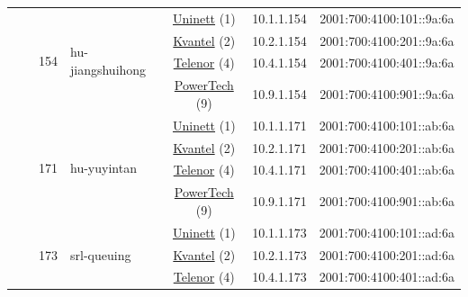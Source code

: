 \begin{small}
\begin{center}
\begin{longtable}{|c|c|c|c|c|c|c|c|}
  &  & \multirow{4}{*}{\tiny{154}} & \multicolumn{1}{|l|}{\multirow{4}{*}{\tiny{hu-jiangshuihong}}} & \multicolumn{2}{|c|}{\tiny{\href{https://www.uninett.no}{Uninett} (1)}} & \tiny{10.1.1.154} & \tiny{2001:700:4100:101::9a:6a} \\* \cline{5-5}\cline{6-6}\cline{7-7}\cline{8-8}
  &  &  &  & \multicolumn{2}{|c|}{\tiny{\href{http://kvantel.no}{Kvantel} (2)}} & \tiny{10.2.1.154} & \tiny{2001:700:4100:201::9a:6a} \\* \cline{5-5}\cline{6-6}\cline{7-7}\cline{8-8}
  &  &  &  & \multicolumn{2}{|c|}{\tiny{\href{https://www.telenor.no}{Telenor} (4)}} & \tiny{10.4.1.154} & \tiny{2001:700:4100:401::9a:6a} \\* \cline{5-5}\cline{6-6}\cline{7-7}\cline{8-8}
  &  &  &  & \multicolumn{2}{|c|}{\tiny{\href{http://www.powertech.no}{PowerTech} (9)}} & \tiny{10.9.1.154} & \tiny{2001:700:4100:901::9a:6a} \\* \cline{3-3}\cline{4-4}\cline{5-5}\cline{6-6}\cline{7-7}\cline{8-8}
  &  & \multirow{4}{*}{\tiny{171}} & \multicolumn{1}{|l|}{\multirow{4}{*}{\tiny{hu-yuyintan}}} & \multicolumn{2}{|c|}{\tiny{\href{https://www.uninett.no}{Uninett} (1)}} & \tiny{10.1.1.171} & \tiny{2001:700:4100:101::ab:6a} \\* \cline{5-5}\cline{6-6}\cline{7-7}\cline{8-8}
  &  &  &  & \multicolumn{2}{|c|}{\tiny{\href{http://kvantel.no}{Kvantel} (2)}} & \tiny{10.2.1.171} & \tiny{2001:700:4100:201::ab:6a} \\* \cline{5-5}\cline{6-6}\cline{7-7}\cline{8-8}
  &  &  &  & \multicolumn{2}{|c|}{\tiny{\href{https://www.telenor.no}{Telenor} (4)}} & \tiny{10.4.1.171} & \tiny{2001:700:4100:401::ab:6a} \\* \cline{5-5}\cline{6-6}\cline{7-7}\cline{8-8}
  &  &  &  & \multicolumn{2}{|c|}{\tiny{\href{http://www.powertech.no}{PowerTech} (9)}} & \tiny{10.9.1.171} & \tiny{2001:700:4100:901::ab:6a} \\* \cline{3-3}\cline{4-4}\cline{5-5}\cline{6-6}\cline{7-7}\cline{8-8}
  &  & \multirow{4}{*}{\tiny{173}} & \multicolumn{1}{|l|}{\multirow{4}{*}{\tiny{srl-queuing}}} & \multicolumn{2}{|c|}{\tiny{\href{https://www.uninett.no}{Uninett} (1)}} & \tiny{10.1.1.173} & \tiny{2001:700:4100:101::ad:6a} \\* \cline{5-5}\cline{6-6}\cline{7-7}\cline{8-8}
  &  &  &  & \multicolumn{2}{|c|}{\tiny{\href{http://kvantel.no}{Kvantel} (2)}} & \tiny{10.2.1.173} & \tiny{2001:700:4100:201::ad:6a} \\* \cline{5-5}\cline{6-6}\cline{7-7}\cline{8-8}
  &  &  &  & \multicolumn{2}{|c|}{\tiny{\href{https://www.telenor.no}{Telenor} (4)}} & \tiny{10.4.1.173} & \tiny{2001:700:4100:401::ad:6a} \\* \cline{5-5}\cline{6-6}\cline{7-7}\cline{8-8}

\end{longtable}
\end{center}
\end{small}
